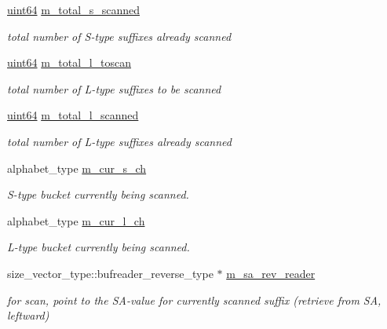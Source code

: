 \begin{DoxyCompactItemize}
\hyperlink{types_8h_a60e8696a4678cd348e991a1f172e53f7}{uint64} \hyperlink{struct_validate4_1_1_l_scan_a7b3fae11ba397c30d0f25f055e02cdf1}{m\+\_\+total\+\_\+s\+\_\+scanned}
\begin{DoxyCompactList}\small\item\em total number of S-\/type suffixes already scanned \end{DoxyCompactList}\item 
\hyperlink{types_8h_a60e8696a4678cd348e991a1f172e53f7}{uint64} \hyperlink{struct_validate4_1_1_l_scan_a400a5151679cb9c9da110cf565e81652}{m\+\_\+total\+\_\+l\+\_\+toscan}
\begin{DoxyCompactList}\small\item\em total number of L-\/type suffixes to be scanned \end{DoxyCompactList}\item 
\hyperlink{types_8h_a60e8696a4678cd348e991a1f172e53f7}{uint64} \hyperlink{struct_validate4_1_1_l_scan_aa9addcdfacecc8d69159683c9f694bef}{m\+\_\+total\+\_\+l\+\_\+scanned}
\begin{DoxyCompactList}\small\item\em total number of L-\/type suffixes already scanned \end{DoxyCompactList}\item 
alphabet\+\_\+type \hyperlink{struct_validate4_1_1_l_scan_ac765bc6e6817fbe71a7aacbd4e2811d9}{m\+\_\+cur\+\_\+s\+\_\+ch}
\begin{DoxyCompactList}\small\item\em S-\/type bucket currently being scanned. \end{DoxyCompactList}\item 
alphabet\+\_\+type \hyperlink{struct_validate4_1_1_l_scan_abf7d8f90883c943c08a007425c43c644}{m\+\_\+cur\+\_\+l\+\_\+ch}
\begin{DoxyCompactList}\small\item\em L-\/type bucket currently being scanned. \end{DoxyCompactList}\item 
size\+\_\+vector\+\_\+type\+::bufreader\+\_\+reverse\+\_\+type $\ast$ \hyperlink{struct_validate4_1_1_l_scan_aa424a1fcc802dbe8556953c1e8d07207}{m\+\_\+sa\+\_\+rev\+\_\+reader}
\begin{DoxyCompactList}\small\item\em for scan, point to the S\+A-\/value for currently scanned suffix (retrieve from SA, leftward) \end{DoxyCompactList}\item 

\end{DoxyCompactItemize}
